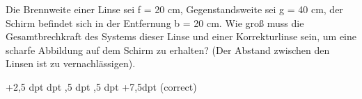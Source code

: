 \documentclass[11pt]{exam}
\begin{document}
\begin{questions}
\vspace{3mm}\question Die Brennweite einer Linse sei f = 20 cm, Gegenstandsweite sei g = 40 cm, der Schirm befindet sich in der Entfernung b = 20 cm. Wie groß muss die Gesamtbrechkraft des Systems dieser Linse und einer Korrekturlinse sein, um eine scharfe Abbildung auf dem Schirm zu erhalten? (Der Abstand zwischen den Linsen ist zu vernachlässigen).

\begin{choices}
	\choice +2,5 dpt
	 dpt
	,5 dpt
	,5 dpt
	\choice +7,5dpt (correct)
\end{choices}

\vspace{3mm}\end{questions}
\end{document}
